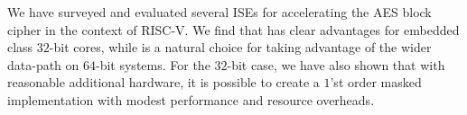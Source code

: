 
We have surveyed and evaluated several ISEs for accelerating
the AES block cipher in the context of RISC-V.
We find that  has clear advantages for embedded class
$32$-bit cores, while  is a natural choice for taking
advantage of the wider data-path on $64$-bit systems.
For the $32$-bit case, we have also shown that with reasonable additional
hardware, it is possible to create a $1$'st order masked implementation with
modest performance and resource overheads.

